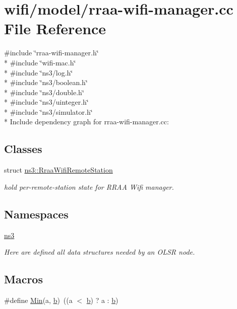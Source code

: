 \hypertarget{rraa-wifi-manager_8cc}{}\section{wifi/model/rraa-\/wifi-\/manager.cc File Reference}
\label{rraa-wifi-manager_8cc}
{\ttfamily \#include \char`\"{}rraa-\/wifi-\/manager.\+h\char`\"{}}\\*
{\ttfamily \#include \char`\"{}wifi-\/mac.\+h\char`\"{}}\\*
{\ttfamily \#include \char`\"{}ns3/log.\+h\char`\"{}}\\*
{\ttfamily \#include \char`\"{}ns3/boolean.\+h\char`\"{}}\\*
{\ttfamily \#include \char`\"{}ns3/double.\+h\char`\"{}}\\*
{\ttfamily \#include \char`\"{}ns3/uinteger.\+h\char`\"{}}\\*
{\ttfamily \#include \char`\"{}ns3/simulator.\+h\char`\"{}}\\*
Include dependency graph for rraa-\/wifi-\/manager.cc\+:
\subsection*{Classes}
\begin{DoxyCompactItemize}
\item 
struct \hyperlink{structns3_1_1RraaWifiRemoteStation}{ns3\+::\+Rraa\+Wifi\+Remote\+Station}
\begin{DoxyCompactList}\small\item\em hold per-\/remote-\/station state for R\+R\+AA Wifi manager. \end{DoxyCompactList}\end{DoxyCompactItemize}
\subsection*{Namespaces}
\begin{DoxyCompactItemize}
\item 
 \hyperlink{namespacens3}{ns3}
\begin{DoxyCompactList}\small\item\em Here are defined all data structures needed by an O\+L\+SR node. \end{DoxyCompactList}\end{DoxyCompactItemize}
\subsection*{Macros}
\begin{DoxyCompactItemize}
\item 
\#define \hyperlink{rraa-wifi-manager_8cc_a9e04209162ea72f9985338596262b657}{Min}(a,  \hyperlink{lte__pathloss_8m_a21ad0bd836b90d08f4cf640b4c298e7c}{b})~((a $<$ \hyperlink{lte__pathloss_8m_a21ad0bd836b90d08f4cf640b4c298e7c}{b}) ? a \+: \hyperlink{lte__pathloss_8m_a21ad0bd836b90d08f4cf640b4c298e7c}{b})
\end{DoxyCompactItemize}
